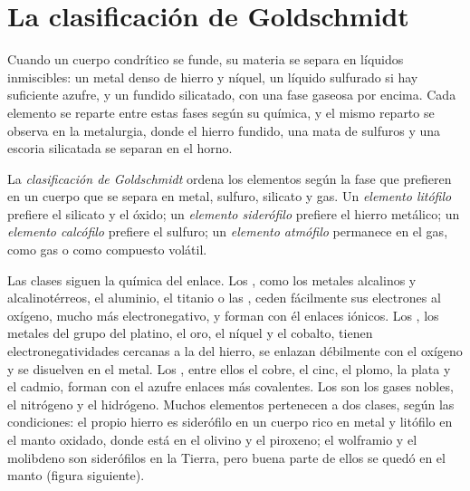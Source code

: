 \section{La clasificación de Goldschmidt}

Cuando un cuerpo condrítico se funde, su materia se separa en líquidos inmiscibles: un
metal denso de hierro y níquel, un líquido sulfurado si hay suficiente azufre, y un
fundido silicatado, con una fase gaseosa por encima. Cada elemento se reparte entre
estas fases según su química, y el mismo reparto se observa en la
metalurgia, donde el hierro fundido, una mata de sulfuros y una escoria silicatada se separan en el
horno.

\begin{definition}
\label{def:b2:elements-in-the-earth:goldschmidt}
La \emph{clasificación de Goldschmidt} ordena
los elementos según la fase que prefieren en un cuerpo que se separa en metal,
sulfuro, silicato y gas. Un \emph{elemento litófilo}
prefiere el silicato y el óxido; un \emph{elemento siderófilo}
prefiere el hierro metálico; un \emph{elemento
calcófilo} prefiere el sulfuro; un \emph{elemento
atmófilo} permanece en el gas, como gas o como compuesto
volátil.
\end{definition}

Las clases siguen la química del enlace. Los , como los metales
alcalinos y alcalinotérreos, el aluminio, el titanio o las , ceden
fácilmente sus electrones al oxígeno, mucho más electronegativo, y
forman con él enlaces iónicos. Los , los metales del grupo del platino, el oro,
el níquel y el cobalto, tienen electronegatividades cercanas a la del hierro, se enlazan débilmente
con el oxígeno y se disuelven en el metal. Los , entre ellos el cobre, el cinc, el plomo,
la plata y el cadmio, forman con el azufre enlaces más covalentes.
Los  son los gases nobles, el nitrógeno y el hidrógeno. Muchos
elementos pertenecen a dos clases, según las condiciones: el propio hierro es
siderófilo en un cuerpo rico en metal y litófilo en el manto oxidado, donde
está en el olivino y el piroxeno; el wolframio y el molibdeno son siderófilos en la
Tierra, pero buena parte de ellos se quedó en el manto (figura siguiente).

